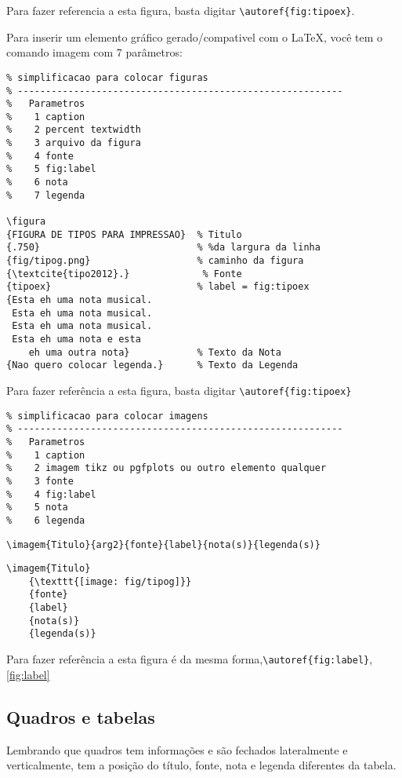 Para fazer referencia a esta figura, basta digitar \verb+\autoref{fig:tipoex}+.

Para inserir um elemento gráfico gerado/compativel com o LaTeX, você tem o comando imagem com 7 parâmetros:

\begin{lstlisting}
% simplificacao para colocar figuras
% ----------------------------------------------------------
%   Parametros
%    1 caption
%    2 percent textwidth
%    3 arquivo da figura
%    4 fonte
%    5 fig:label
%    6 nota
%    7 legenda

\figura
{FIGURA DE TIPOS PARA IMPRESSAO}  % Titulo
{.750}                            % %da largura da linha
{fig/tipog.png}                   % caminho da figura
{\textcite{tipo2012}.}             % Fonte
{tipoex}                          % label = fig:tipoex
{Esta eh uma nota musical. 
 Esta eh uma nota musical.
 Esta eh uma nota musical. 
 Esta eh uma nota e esta 
	eh uma outra nota}            % Texto da Nota
{Nao quero colocar legenda.}      % Texto da Legenda
\end{lstlisting}

Para fazer referência a esta figura, basta digitar \verb+\autoref{fig:tipoex}+

\begin{lstlisting}
% simplificacao para colocar imagens
% ----------------------------------------------------------
%   Parametros
%    1 caption
%    2 imagem tikz ou pgfplots ou outro elemento qualquer
%    3 fonte
%    4 fig:label
%    5 nota
%    6 legenda
\end{lstlisting}

\verb+\imagem{Titulo}{arg2}{fonte}{label}{nota(s)}{legenda(s)}+

\begin{lstlisting}
\imagem{Titulo}
	{\texttt{[image: fig/tipog]}}
	{fonte}
	{label}
	{nota(s)}
	{legenda(s)}
\end{lstlisting}



Para fazer referência a esta figura é da mesma forma,\verb+\autoref{fig:label}+, \autoref{fig:label}

\subsection[Quadros e tabelas]{Quadros e tabelas}

Lembrando que quadros tem informações e são fechados lateralmente e verticalmente, tem a posição do título, fonte, nota e legenda diferentes da tabela.
